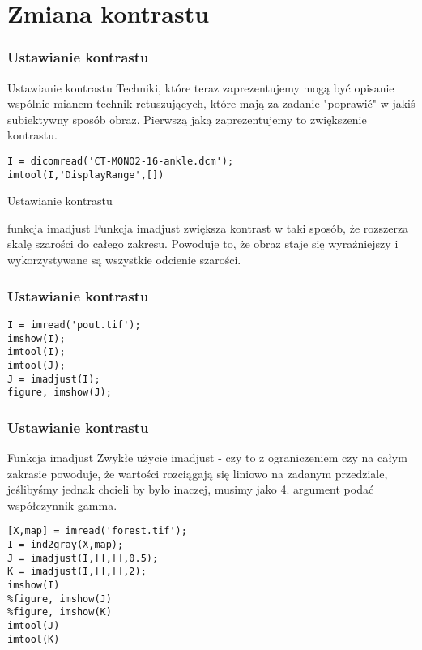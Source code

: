 \documentclass{beamer}
\begin{document}
\section{Zmiana kontrastu}

\begin{frame}[fragile]
\frametitle{Ustawianie kontrastu}
\begin{block}{Ustawianie kontrastu}
Techniki, które teraz zaprezentujemy mogą być opisanie wspólnie mianem technik retuszujących, które mają za zadanie "poprawić" w jakiś subiektywny sposób obraz. Pierwszą jaką zaprezentujemy to zwiększenie kontrastu.
\end{block}

\begin{example}
\begin{lstlisting}
I = dicomread('CT-MONO2-16-ankle.dcm');
imtool(I,'DisplayRange',[])
\end{lstlisting}
\end{example}

\end{frame}

\begin{frame}{Ustawianie kontrastu}
\begin{block}{funkcja imadjust}
Funkcja imadjust zwiększa kontrast w taki sposób, że rozszerza skalę szarości do całego zakresu. Powoduje to, że obraz staje się wyraźniejszy i wykorzystywane są wszystkie odcienie szarości.
\end{block}
\end{frame}

\begin{frame}[fragile]
\frametitle{Ustawianie kontrastu}
\begin{example}
\begin{lstlisting}
I = imread('pout.tif');
imshow(I);
imtool(I);
imtool(J);
J = imadjust(I);
figure, imshow(J);
\end{lstlisting}
\end{example}
\end{frame}

\begin{frame}[fragile]
\frametitle{Ustawianie kontrastu}
\begin{block}{Funkcja imadjust}
Zwykłe użycie imadjust - czy to z ograniczeniem czy na całym zakrasie powoduje, że wartości rozciągają się liniowo na zadanym przedziale, jeślibyśmy jednak chcieli by było inaczej, musimy jako 4. argument podać współczynnik gamma.
\end{block}
\begin{example}
\begin{lstlisting}
[X,map] = imread('forest.tif');
I = ind2gray(X,map);
J = imadjust(I,[],[],0.5);
K = imadjust(I,[],[],2);
imshow(I)
%figure, imshow(J)
%figure, imshow(K)
imtool(J)
imtool(K)
\end{lstlisting}
\end{example}
\end{frame}
\end{document}
